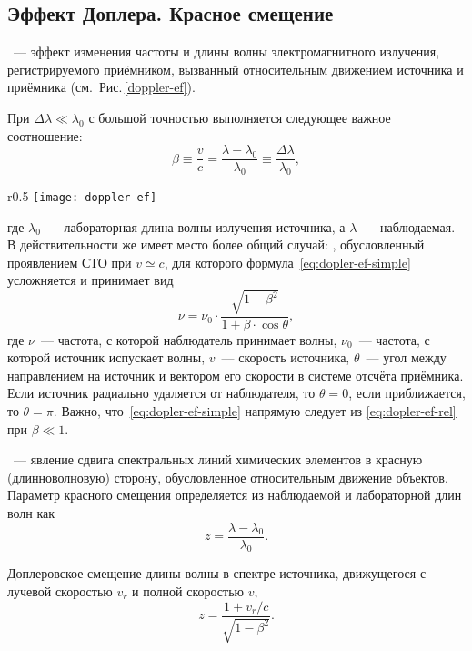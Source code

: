 \subsection{Эффект Доплера. Красное смещение}
~--- эффект изменения частоты и длины волны электромагнитного излучения, регистрируемого приёмником, вызванный относительным движением источника и приёмника (см.~Рис.\,\ref{doppler-ef}).

При $\Delta \lambda \ll \lambda_0$ с большой точностью выполняется следующее важное соотношение:\begin{equation}
\beta \equiv \dfrac{v}{c} = \dfrac{\lambda - \lambda_0}{\lambda_0} \equiv \dfrac{\Delta \lambda}{\lambda_0},
\label{eq:dopler-ef-simple}
\end{equation}
\begin{wrapfigure}[6]{r}{0.5\tw}
\centering
\vspace{-.5pc}
\texttt{[image: doppler-ef]}
\caption{Эффект Доплера}
\label{doppler-ef}
\end{wrapfigure}
где $\lambda_0$~--- лабораторная длина волны излучения источника, а $\lambda$~--- наблюдаемая. В действительности же имеет место более общий случай: , обусловленный проявлением СТО при $v \simeq c$, для которого формула~\eqref{eq:dopler-ef-simple} усложняется и принимает вид
\begin{equation}
\nu = \nu_0 \cdot \dfrac{\sqrt{1 - \beta^2}}{1 + \beta \cdot \cos\theta},
\label{eq:dopler-ef-rel}
\end{equation}
где $\nu$~--- частота, с которой наблюдатель принимает волны, $\nu_0$~--- частота, с которой источник испускает волны, $v$~--- скорость источника, $\theta$~--- угол между направлением на источник и вектором его скорости в системе отсчёта приёмника. Если источник радиально удаляется от наблюдателя, то $\theta = 0$, если приближается, то $\theta =\pi$. Важно, что~\eqref{eq:dopler-ef-simple} напрямую следует из \eqref{eq:dopler-ef-rel} при $\beta  \ll 1$.

~--- явление сдвига спектральных линий химических элементов в красную (длинноволновую) сторону, обусловленное относительным движение объектов. Параметр красного смещения определяется из наблюдаемой и лабораторной длин волн как
\begin{equation}
z = \dfrac{\lambda - \lambda_0}{\lambda_0}.
\end{equation}

Доплеровское смещение длины волны в спектре источника, движущегося с лучевой скоростью $v_{r}$ и полной скоростью $v$,
\begin{equation}
z = \dfrac{1 + v_r / c}{\sqrt{1 - \beta^2}}.
\end{equation}

